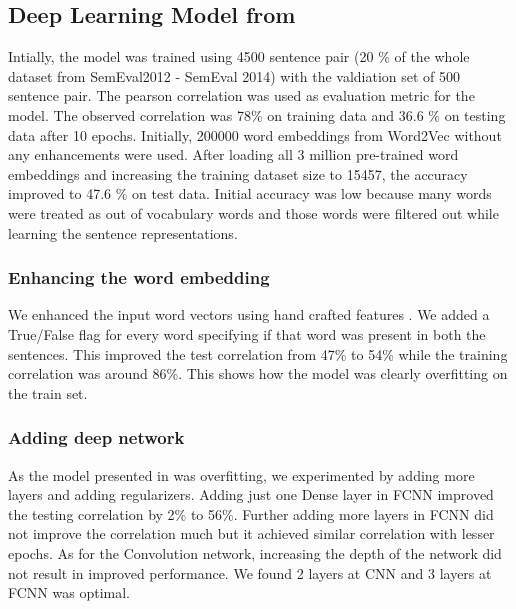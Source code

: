 \documentclass{article} %
\begin{document}
	\subsection{Deep Learning Model from \cite{CNN}}
	 Intially, the model was trained using 4500 sentence pair (20 \% of the whole dataset from SemEval2012 - SemEval 2014) with the valdiation set of 500 sentence pair. The pearson correlation was used as evaluation metric for the model. The observed correlation was 78\% on training data and 36.6 \% on testing data after 10 epochs. Initially, 200000 word embeddings from Word2Vec without any enhancements were used. After loading all 3 million pre-trained word embeddings and increasing the training dataset size to 15457, the accuracy improved to 47.6 \% on test data. Initial accuracy was low because many words were treated as out of vocabulary words and those words were filtered out while learning the sentence representations.
	 \begin{figure}[htp]
  \hspace*{\fill}%
  \hfill%
  \hspace*{\fill}%
\end{figure}

	 \subsubsection{Enhancing the word embedding}
	 We enhanced the input word vectors using hand crafted features \cite{CNN}. We added a True/False flag for every word specifying if that word was present in both the sentences. This improved the test correlation from 47\% to 54\% while the training correlation was around 86\%. This shows how the model was clearly overfitting on the train set. 
	 
	 \subsubsection{Adding deep network}
	 As the model presented in \cite{CNN} was overfitting, we experimented by adding more layers and adding regularizers. Adding just one Dense layer in FCNN improved the testing correlation by 2\% to 56\%. Further adding more layers in FCNN did not improve the correlation much but it achieved similar correlation with lesser epochs. As for the Convolution network, increasing the depth of the network did not result in improved performance. We found 2 layers at CNN and 3 layers at FCNN was optimal.
	 
\end{document}
